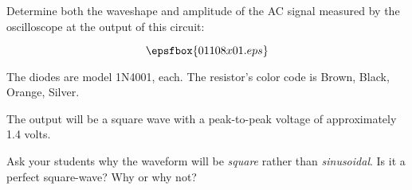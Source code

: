 

Determine both the waveshape and amplitude of the AC signal measured by the oscilloscope at the output of this circuit:

$$\epsfbox{01108x01.eps}$$

The diodes are model 1N4001, each.  The resistor's color code is Brown, Black, Orange, Silver.







The output will be a square wave with a peak-to-peak voltage of approximately 1.4 volts.







Ask your students why the waveform will be {\it square} rather than {\it sinusoidal}.  Is it a perfect square-wave?  Why or why not?




